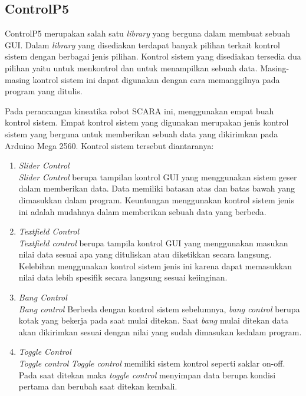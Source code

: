 \subsection{ControlP5}
ControlP5 merupakan salah satu \textit{library} yang berguna dalam membuat sebuah GUI. Dalam \textit{library} yang disediakan terdapat banyak pilihan terkait kontrol sistem dengan berbagai jenis pilihan. Kontrol sistem yang disediakan tersedia dua pilihan yaitu untuk menkontrol dan untuk menampilkan sebuah data. Masing-masing kontrol sistem ini dapat digunakan dengan cara memanggilnya pada program yang ditulis.

Pada perancangan kineatika robot SCARA ini, menggunakan empat buah kontrol sistem. Empat kontrol sistem yang digunakan merupakan jenis kontrol sistem yang berguna untuk memberikan sebuah data yang dikirimkan pada Arduino Mega 2560. Kontrol sistem tersebut diantaranya:
\begin{enumerate}
	\item \textit{Slider Control} \\
	\textit{Slider Control} berupa tampilan kontrol GUI yang menggunakan sistem geser dalam memberikan data. Data memiliki batasan atas dan batas bawah yang dimasukkan dalam program. Keuntungan menggunakan kontrol sistem jenis ini adalah mudahnya dalam memberikan sebuah data yang berbeda.


	\item \textit{Textfield Control} \\
\textit{Textfield control} berupa tampila kontrol GUI yang menggunakan masukan nilai data sesuai apa yang dituliskan atau diketikkan secara langsung. Kelebihan menggunakan kontrol sistem jenis ini karena dapat memasukkan nilai data lebih spesifik secara langsung sesuai keiinginan.
	
	\item \textit{Bang Control} \\
\textit{Bang control}
Berbeda dengan kontrol sistem sebelumnya,\textit{ bang control }berupa kotak yang bekerja pada saat mulai ditekan. Saat \textit{bang} mulai ditekan data akan dikirimkan sesuai dengan nilai yang sudah dimasukan kedalam program. 
	

	\item \textit{Toggle Control} \\
\textit{Toggle control}
\textit{Toggle control} memiliki sistem kontrol seperti saklar on-off. Pada saat ditekan maka \textit{toggle control} menyimpan data berupa kondisi pertama dan berubah saat ditekan kembali. 

\end{enumerate}
